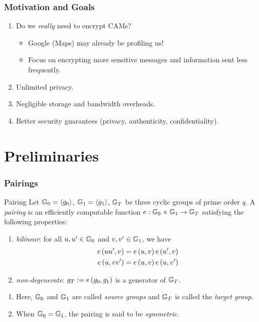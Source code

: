\documentclass{beamer}
\begin{document}
    \begin{frame}
        \frametitle{Motivation and Goals}
        \begin{enumerate}
            \item<1-> Do we \emph{really} need to encrypt CAMs?
            \begin{itemize}
                \item Google (Maps) may already be profiling us!
                \item Focus on encrypting more sensitive messages and
                information sent less frequently.
            \end{itemize}
            \item<2-> Unlimited privacy.
            \item<3-> Negligible storage and bandwidth overheads.
            \item<4-> Better security guarantees (privacy, authenticity,
            confidentiality).
        \end{enumerate}
    \end{frame}

    \section{Preliminaries}

    \begin{frame}
        \frametitle{Pairings}
        \begin{definition}{Pairing}
            Let \(\mathbb G_0 = \left\langle g_0 \right\rangle\), \(\mathbb G_1 = \left\langle g_1 \right\rangle\), \(\mathbb G_T\) be
            three cyclic groups of prime order \(q\). A \emph{pairing} is an
            efficiently computable function \(e: \mathbb G_0 \times \mathbb G_1 \rightarrow
            \mathbb G_T\) satisfying the following properties:
            \begin{enumerate}
                \item \emph{bilinear}: for all \(u, u^{\prime} \in \mathbb G_0\) and
                \(v, v^{\prime} \in \mathbb G_1\), we have
                \begin{align}
                    e\left(uu^{\prime}, v\right) &= e\left(u,v\right)e\left(u^{\prime},v\right) \\
                    e\left(u, vv^{\prime}\right) &= e\left(u,v\right)e\left(u, v^{\prime}\right)
                \end{align}
                \item \emph{non-degenerate}: \(g_T := e\left(g_0, g_1\right)\) is a
                generator of \(\mathbb G_T\).
            \end{enumerate}
        \end{definition}
        \begin{enumerate}
            \item Here, \(\mathbb G_0\) and \(\mathbb G_1\) are called \emph{source
            groups} and \(\mathbb G_T\) is called the \emph{target group}.
            \item When \(\mathbb G_0 = \mathbb G_1\), the pairing is said to be
            \emph{symmetric}.
        \end{enumerate}
    \end{frame}
\end{document}
